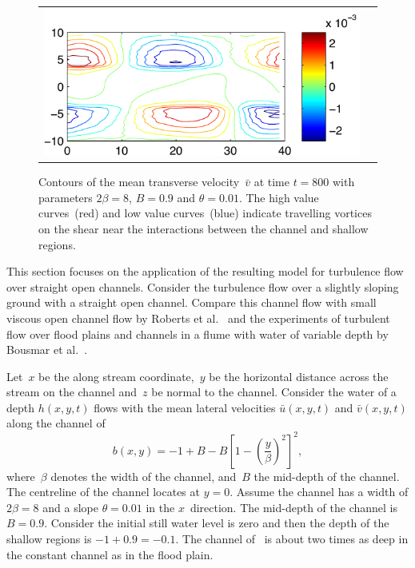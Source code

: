 \documentclass[a5paper,12pt]{article}
\newcommand{\uu}{{\bar u}}
\newcommand{\vv}{{\bar v}}
\begin{document}
\begin{figure}
\centering
\begin{tabular}{c@{}c}
\includegraphics[scale=0.8]{straight-velocity-vc}
\end{tabular}
\caption{Contours of the mean transverse velocity~$\vv$ at time $t=800$ with parameters $2\beta=8$, $B=0.9$ and $\theta=0.01$. 
The high value curves~(red) and low value curves~(blue) indicate travelling vortices on the shear near the interactions between the channel and shallow regions. }
\label{straight-velocity-vc}
\end{figure}%

This section focuses on the application of the resulting model for turbulence flow over straight open channels. 
Consider the turbulence flow over a slightly sloping ground with a straight open channel. 
Compare this channel flow with small viscous open channel flow by Roberts et al.~\cite{Robertsli2006} and the experiments of turbulent flow over flood plains and channels in a flume with water of variable depth by Bousmar et al.~\cite{Bousmar2002,Bousmar2003a}. 
 
 Let~$x$ be the along stream coordinate,~$y$ be the horizontal distance across the stream on the channel and~$z$ be normal to the channel. 
Consider the water of a depth $h(x,y,t)$ flows with the mean lateral velocities $\uu(x,y,t)$ and $\vv(x,y,t)$ along the channel of
\begin{equation}
b(x,y)=-1+B-B\left[1-\left(\frac{y}{\beta}\right)^2\right]^2,\label{bed:straight}
\end{equation}
where~$\beta$ denotes the width of the channel, and~$B$ the mid-depth of the channel.  
The centreline of the channel locates at $y=0$.
Assume the channel has a width of  $2\beta=8$ and a slope $\theta=0.01$ in the $x$~direction.  
The mid-depth of the channel is $B=0.9$.
Consider the initial still water level is zero and then the depth of the shallow regions is $-1+0.9=-0.1$.
The channel of~\cite{Bousmar2002} is about two times as deep in the constant channel as in the flood plain.
\end{document}
